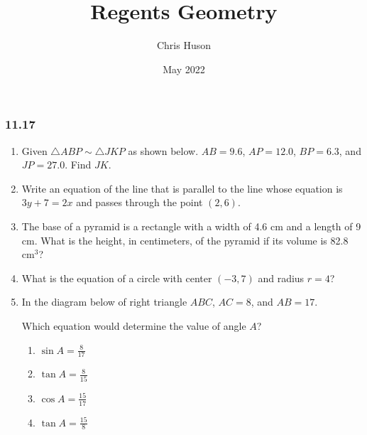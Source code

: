 \documentclass[12pt, oneside]{article}
\title{Regents Geometry}
\author{Chris Huson}
\date{May 2022}
\begin{document}
\subsubsection*{11.17 }
\begin{enumerate}[itemsep=1.2cm]
\item Given $\triangle ABP \sim \triangle JKP$ as shown below. $AB=9.6$, $AP=12.0$, $BP=6.3$, and $JP=27.0$. Find $JK$.
    \begin{flushright}
      \end{flushright}

\item Write an equation of the line that is parallel to the line whose equation is $3y+7=2x$ and passes through the point $(2,6)$.

\item The base of a pyramid is a rectangle with a width of 4.6 cm and a
length of 9 cm. What is the height, in centimeters, of the pyramid if
its volume is 82.8 cm$^3$?

\item What is the equation of a circle with center $(-3,7)$ and radius $r=4$?

\item In the diagram below of right triangle $ABC$, $AC=8$, and $AB=17$.
  \begin{center}
  \end{center}
    Which equation would determine the value of angle $A$?
  \begin{multicols}{2}
    \begin{enumerate}
      \item $\displaystyle \sin A = \frac{8}{17}$
      \item $\displaystyle \tan A = \frac{8}{15}$
      \item $\displaystyle \cos A = \frac{15}{17}$
      \item $\displaystyle \tan A = \frac{15}{8}$
    \end{enumerate}
  \end{multicols}


\end{enumerate}
\end{document}
